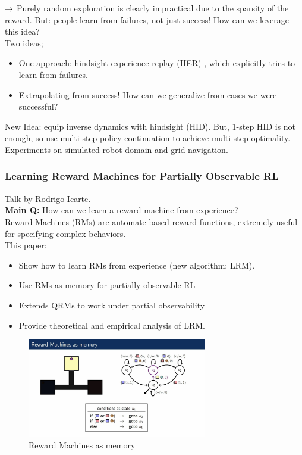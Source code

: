 $\rightarrow$ Purely random exploration is clearly impractical due to the sparsity of the reward. But: people learn from failures, not just success! How can we leverage this idea? \\

Two ideas;
\begin{itemize}
    \item One approach: hindsight experience replay (HER) \cite{andrychowicz2017hindsight}, which explicitly tries to learn from failures.
    \item Extrapolating from success! How can we generalize from cases we were successful?
\end{itemize}

New Idea: equip inverse dynamics with hindsight (HID). But, 1-step HID is not enough, so use multi-step policy continuation to achieve multi-step optimality. \\

Experiments on simulated robot domain and grid navigation.

\spacerule
\subsubsection{Learning Reward Machines for Partially Observable RL \cite{icarte2019learning}}

Talk by Rodrigo Icarte. \\

{\bf Main Q:} How can we learn a reward machine from experience? \\

Reward Machines (RMs) are automate based reward functions, extremely useful for specifying complex behaviors. \\


This paper:
\begin{itemize}
    \item Show how to learn RMs from experience (new algorithm: LRM).
    \item Use RMs as memory for partially observable RL
    \item Extends QRMs to work under partial observability
    \item Provide theoretical and empirical analysis of LRM.
\end{itemize}

\begin{figure}[h!]
    \centering
    \includegraphics[width=0.7\textwidth]{figures/rm.png}
    \caption{Reward Machines as memory}
    \label{fig:rm}
\end{figure}
 
